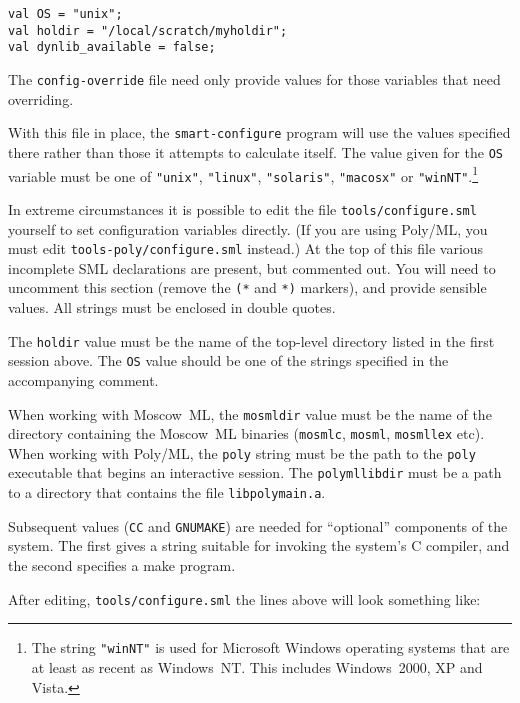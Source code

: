 \begin{session}
\begin{verbatim}
val OS = "unix";
val holdir = "/local/scratch/myholdir";
val dynlib_available = false;
\end{verbatim}
\end{session}

The \texttt{config-override} file need only provide values for those
variables that need overriding.

With this file in place, the \texttt{smart-configure} program will use
the values specified there rather than those it attempts to calculate
itself.  The value given for the \texttt{OS} variable must be one of
\texttt{"unix"}, \texttt{"linux"}, \texttt{"solaris"},
\texttt{"macosx"} or \texttt{"winNT"}.\footnote{The string
  \texttt{"winNT"} is used for Microsoft Windows operating systems
  that are at least as recent as Windows~NT.  This includes
  Windows~2000, XP and Vista.}

In extreme circumstances it is possible to edit the file
\texttt{tools/configure.sml} yourself to set configuration variables
directly.  (If you are using Poly/ML, you must edit
\texttt{tools-poly/configure.sml} instead.) At the top of this file
various incomplete SML declarations are present, but commented out.
You will need to uncomment this section (remove the \texttt{(*} and
\texttt{*)} markers), and provide sensible values.  All strings must
be enclosed in double quotes.

The \texttt{holdir} value must be the name of the top-level directory
listed in the first session above.  The \texttt{OS} value should be
one of the strings specified in the accompanying comment.

When working with Moscow~ML, the \texttt{mosmldir} value must be the
name of the directory containing the Moscow~ML binaries
(\texttt{mosmlc}, \texttt{mosml}, \texttt{mosmllex} etc).  When
working with Poly/ML, the \texttt{poly} string must be the path to the
\texttt{poly} executable that begins an interactive \ML{} session.
The \texttt{polymllibdir} must be a path to a directory that contains
the file \texttt{libpolymain.a}.

Subsequent values (\texttt{CC} and \texttt{GNUMAKE}) are needed for
``optional'' components of the system.  The first gives a string
suitable for invoking the system's C compiler, and the second
specifies a \textsf{make} program.

After editing, \texttt{tools/configure.sml} the lines above will look
something like:

